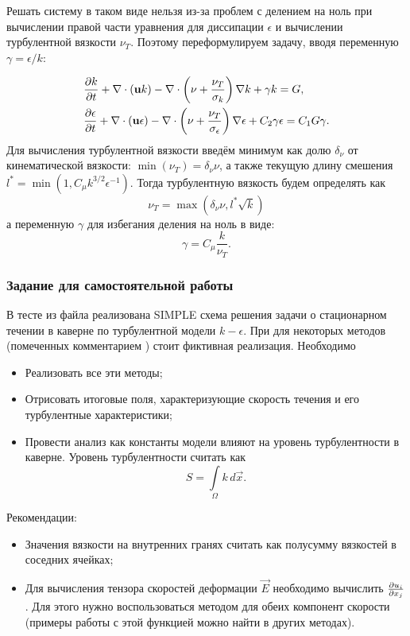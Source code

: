 Решать систему в таком виде нельзя из-за проблем с делением на ноль при вычислении правой части уравнения для диссипации $\epsilon$ и вычислении турбулентной вязкости $\nu_T$.
Поэтому переформулируем задачу, вводя переменную $\gamma = \epsilon/k$:

\begin{align*}
&\frac{\partial k}{\partial t} + \nabla\cdot(\boldsymbol{\rm u} k) - \nabla \cdot \left(\nu + \frac{\nu_T}{\sigma_k}\right)\nabla k + \gamma k = G, \\
&\frac{\partial \epsilon}{\partial t} + \nabla\cdot(\boldsymbol{\rm u} \epsilon) - \nabla \cdot \left(\nu + \frac{\nu_T}{\sigma_\epsilon}\right)\nabla \epsilon + C_2 \gamma \epsilon = 
	C_1 G \gamma.
\end{align*}
Для вычисления турбулентной вязкости введём минимум как долю $\delta_\nu$ от кинематической вязкости: $\min(\nu_T) = \delta_\nu \nu$,
а также текущую длину смешения $l^* = \min(1, C_\mu k ^{3/2} \epsilon^{-1})$.
Тогда турбулентную вязкость будем определять как
\begin{equation}
\label{eq:nut_nozerodiv}
\nu_T = \max(\delta_\nu \nu, l^* \sqrt k)
\end{equation}
а переменную $\gamma$ для избегания деления на ноль в виде:
\begin{equation*}
\gamma = C_\mu \frac{k}{\nu_T}.
\end{equation*}


\subsubsection{Задание для самостоятельной работы}
В тесте  из файла 
реализована SIMPLE схема решения задачи о стационарном течении в каверне
по турбулентной модели $k-\epsilon$. При для некоторых методов (помеченных комментарием )
стоит фиктивная реализация.
Необходимо
\begin{itemize}
\item Реализовать все эти методы;
\item Отрисовать итоговые поля, характеризующие скорость течения и его турбулентные характеристики;
\item Провести анализ как константы модели влияют на уровень турбулентности в каверне. Уровень турбулентности
      считать как
\begin{equation*}
S = \int\limits_\Omega k \, d\vec x.
\end{equation*}
\end{itemize}

Рекомендации:
\begin{itemize}
\item Значения вязкости на внутренних гранях считать как полусумму вязкостей в соседних ячейках;
\item Для вычисления тензора скоростей деформации $\vec E$ необходимо вычислить $\frac{\partial u_i}{\partial x_j}$.
Для этого нужно воспользоваться методом  для обеих компонент скорости (примеры работы с этой функцией можно найти в других методах).
\end{itemize}
